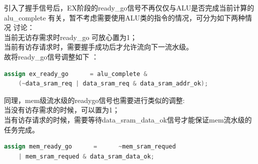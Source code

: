 \documentclass[11pt]{article}
\begin{document}
\begin{enumerate}
  引入了握手信号后，EX阶段的ready_go信号不再仅仅与ALU是否完成当前计算的
  alu_complete 有关，暂不考虑需要使用ALU类的指令的情况，可分为如下两种情况
  讨论：\\
  当前无访存需求时ready_go 可放心置为1；\\
  当前有访存请求时，需要握手成功后才允许流向下一流水级。\\
  故将ready_go信号调整如下 ：
  \begin{lstlisting}[language=verilog]
    assign ex_ready_go      = alu_complete & 
    (~data_sram_req | data_sram_req & data_sram_addr_ok);
  \end{lstlisting}
  同理，mem级流水级的readygo信号也需要进行类似的调整:\\
  当没有访存需求的时候，可以置为1；\\
  当有访存请求的时候，需要等待data_sram_data_ok信号才能保证mem流水级的任务完成。
  \begin{lstlisting}[language=verilog]
    assign mem_ready_go      =      ~mem_sram_requed 
    | mem_sram_requed & data_sram_data_ok;
  \end{lstlisting}
\end{enumerate}
\end{document}
